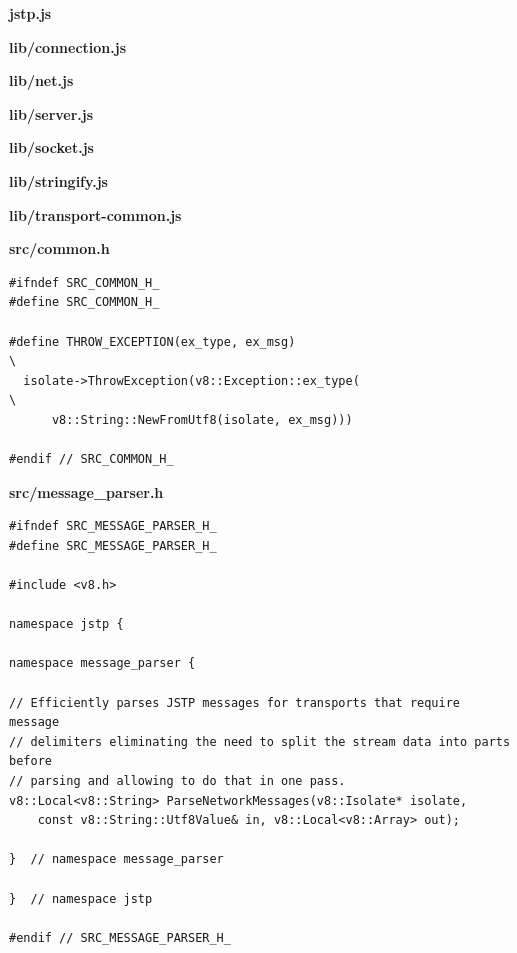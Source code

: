 \documentclass[%
  ukrainian, utf8, columnvii, simple,
  hpadding=10mm, vpadding=10mm, reduceheight=2mm,
  floatsection,
]{eskdtext}
\newcommand{\jstpFile}[1]{%
  \textbf{#1}

  
}
\begin{document}
\maketitle

\jstpFile{jstp.js}



\jstpFile{lib/connection.js}



\jstpFile{lib/net.js}




\jstpFile{lib/server.js}




\jstpFile{lib/socket.js}

\jstpFile{lib/stringify.js}


\jstpFile{lib/transport-common.js}





\textbf{src/common.h}

\begin{verbatim}
#ifndef SRC_COMMON_H_
#define SRC_COMMON_H_

#define THROW_EXCEPTION(ex_type, ex_msg)                                       \
  isolate->ThrowException(v8::Exception::ex_type(                              \
      v8::String::NewFromUtf8(isolate, ex_msg)))

#endif // SRC_COMMON_H_
\end{verbatim}

\textbf{src/message\_parser.h}

\begin{verbatim}
#ifndef SRC_MESSAGE_PARSER_H_
#define SRC_MESSAGE_PARSER_H_

#include <v8.h>

namespace jstp {

namespace message_parser {

// Efficiently parses JSTP messages for transports that require message
// delimiters eliminating the need to split the stream data into parts before
// parsing and allowing to do that in one pass.
v8::Local<v8::String> ParseNetworkMessages(v8::Isolate* isolate,
    const v8::String::Utf8Value& in, v8::Local<v8::Array> out);

}  // namespace message_parser

}  // namespace jstp

#endif // SRC_MESSAGE_PARSER_H_
\end{verbatim}
\end{document}
